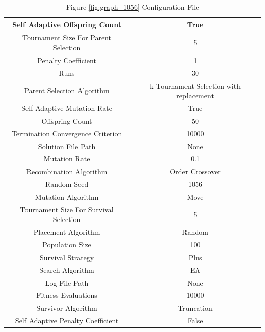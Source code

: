 \documentclass{standalone}
\begin{document}
\begin{table}[!htb]
	\centering
	\caption{Figure \ref{fig:graph_1056} Configuration File}
	\label{tab:graph_1056}
	\begin{tabular}{| c | c |}
		\hline
		Self Adaptive Offspring Count		& True		 \\
		\hline
		Tournament Size For Parent Selection		& 5		 \\
		\hline
		Penalty Coefficient		& 1		 \\
		\hline
		Runs		& 30		 \\
		\hline
		Parent Selection Algorithm		& k-Tournament Selection with replacement		 \\
		\hline
		Self Adaptive Mutation Rate		& True		 \\
		\hline
		Offspring Count		& 50		 \\
		\hline
		Termination Convergence Criterion		& 10000		 \\
		\hline
		Solution File Path		& None		 \\
		\hline
		Mutation Rate		& 0.1		 \\
		\hline
		Recombination Algorithm		& Order Crossover		 \\
		\hline
		Random Seed		& 1056		 \\
		\hline
		Mutation Algorithm		& Move		 \\
		\hline
		Tournament Size For Survival Selection		& 5		 \\
		\hline
		Placement Algorithm		& Random		 \\
		\hline
		Population Size		& 100		 \\
		\hline
		Survival Strategy		& Plus		 \\
		\hline
		Search Algorithm		& EA		 \\
		\hline
		Log File Path		& None		 \\
		\hline
		Fitness Evaluations		& 10000		 \\
		\hline
		Survivor Algorithm		& Truncation		 \\
		\hline
		Self Adaptive Penalty Coefficient		& False		 \\
		\hline
	\end{tabular}
\end{table}
\end{document}
